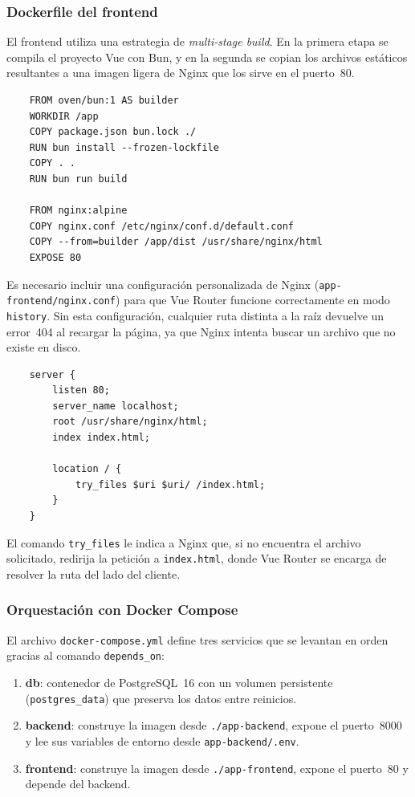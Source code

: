 \subsubsection*{Dockerfile del frontend}

El frontend utiliza una estrategia de \emph{multi-stage build}. En la primera etapa se
compila el proyecto Vue con Bun, y en la segunda se copian los archivos estáticos resultantes
a una imagen ligera de Nginx que los sirve en el puerto~80.

\begin{lstlisting}
	FROM oven/bun:1 AS builder
	WORKDIR /app
	COPY package.json bun.lock ./
	RUN bun install --frozen-lockfile
	COPY . .
	RUN bun run build
	
	FROM nginx:alpine
	COPY nginx.conf /etc/nginx/conf.d/default.conf
	COPY --from=builder /app/dist /usr/share/nginx/html
	EXPOSE 80
\end{lstlisting}

Es necesario incluir una configuración personalizada de Nginx
(\texttt{app-frontend/nginx.conf}) para que Vue Router funcione correctamente en modo
\texttt{history}. Sin esta configuración, cualquier ruta distinta a la raíz devuelve un
error~404 al recargar la página, ya que Nginx intenta buscar un archivo que no existe en
disco.

\begin{lstlisting}
	server {
		listen 80;
		server_name localhost;
		root /usr/share/nginx/html;
		index index.html;
		
		location / {
			try_files $uri $uri/ /index.html;
		}
	}
\end{lstlisting}

El comando \texttt{try\_files} le indica a Nginx que, si no encuentra el archivo solicitado,
redirija la petición a \texttt{index.html}, donde Vue Router se encarga de resolver la ruta
del lado del cliente.

\subsubsection*{Orquestación con Docker Compose}

El archivo \texttt{docker-compose.yml} define tres servicios que se levantan en orden
gracias al comando \texttt{depends\_on}:

\begin{enumerate}
	\item \textbf{db}: contenedor de PostgreSQL~16 con un volumen persistente
	(\texttt{postgres\_data}) que preserva los datos entre reinicios.
	\item \textbf{backend}: construye la imagen desde \texttt{./app-backend}, expone el
	puerto~8000 y lee sus variables de entorno desde \texttt{app-backend/.env}.
	\item \textbf{frontend}: construye la imagen desde \texttt{./app-frontend}, expone el
	puerto~80 y depende del backend.
\end{enumerate}

